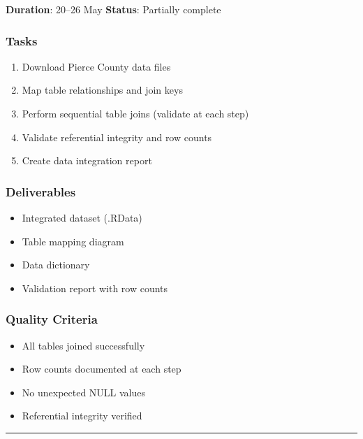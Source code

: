 \documentclass[
  english,
  letterpaper,
  DIV=11,
  numbers=noendperiod]{scrreprt}
\providecommand{\tightlist}{%
  \setlength{\itemsep}{0pt}\setlength{\parskip}{0pt}}
\begin{document}
\textbf{Duration}: 20--26 May \textbar{} \textbf{Status}: Partially
complete

\subsubsection{Tasks}\label{tasks-1}

\begin{enumerate}
\def\labelenumi{\arabic{enumi}.}
\tightlist
\item
  Download Pierce County data files
\item
  Map table relationships and join keys
\item
  Perform sequential table joins (validate at each step)
\item
  Validate referential integrity and row counts
\item
  Create data integration report
\end{enumerate}

\subsubsection{Deliverables}\label{deliverables-1}

\begin{itemize}
\tightlist
\item
  Integrated dataset (.RData)
\item
  Table mapping diagram
\item
  Data dictionary
\item
  Validation report with row counts
\end{itemize}

\subsubsection{Quality Criteria}\label{quality-criteria}

\begin{itemize}
\tightlist
\item[$\square$]
  All tables joined successfully
\item[$\square$]
  Row counts documented at each step
\item[$\square$]
  No unexpected NULL values
\item[$\square$]
  Referential integrity verified
\end{itemize}

\begin{center}\rule{0.5\linewidth}{0.5pt}\end{center}
\end{document}
